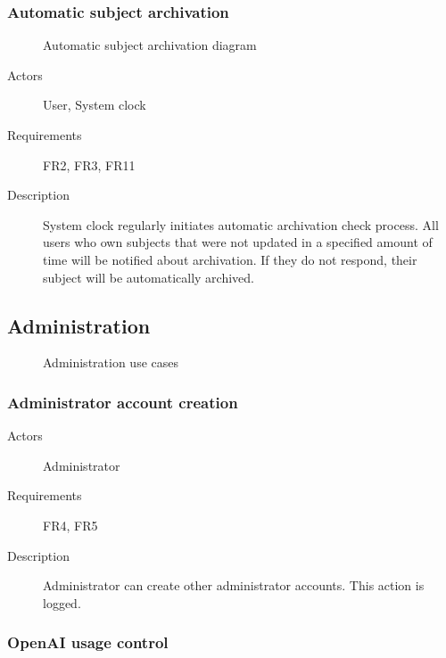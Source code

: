 \documentclass[
    english, %
]{VUMIFPSkursinis}
\begin{document}
\subsubsection{Automatic subject archivation}

\begin{figure}[ht]
    \centering
    
    \label{automatic-archivation-use-case}
    \caption{Automatic subject archivation diagram}
\end{figure}

\begin{description}
    \item[Actors] User, System clock
    \item[Requirements] FR2, FR3, FR11
    \item[Description] System clock regularly initiates automatic archivation check process. All users who own subjects that were not updated in a specified amount of time will be notified about archivation. If they do not respond, their subject will be automatically archived.
\end{description}

\subsection{Administration}

\begin{figure}[ht]
    \centering
    
    \label{administration-use-cases}
    \caption{Administration use cases}
\end{figure}

\subsubsection{Administrator account creation}

\begin{description}
    \item[Actors] Administrator
    \item[Requirements] FR4, FR5
    \item[Description] Administrator can create other administrator accounts. This action is logged.
\end{description}

\subsubsection{OpenAI usage control}
\end{document}
